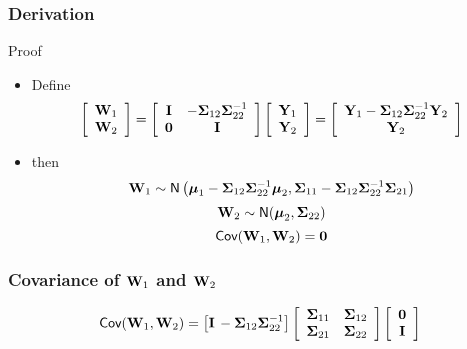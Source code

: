 \documentclass{beamer}
\begin{document}
\begin{frame}
  \frametitle{Derivation}
  \begin{block}{Proof}
    \begin{itemize}
    \item Define
$$  \left[
  \begin{array}{c}
\mathbf{W}_1  \\ \mathbf{W}_2 \end{array} \right] =  \left[ \begin{array}{cc}
\mathbf{I} & -\boldsymbol{\Sigma}_{12} \boldsymbol{\Sigma}_{22}^{-1}  \\ \mathbf{0} & \mathbf{I} \end{array} \right]  \left[
  \begin{array}{c}
\mathbf{Y}_1  \\ \mathbf{Y}_2 \end{array} \right] =  \left[
  \begin{array}{c}
\mathbf{Y}_1 - \boldsymbol{\Sigma}_{12} \boldsymbol{\Sigma}_{22}^{-1} \mathbf{Y}_2  \\ \mathbf{Y}_2 \end{array} \right]
 $$
\pause
\item  then
$$\mathbf{W}_1 \sim \textsf{N}\left( \boldsymbol{\mu}_1 - \boldsymbol{\Sigma}_{12} \boldsymbol{\Sigma}_{22}^{-1} \boldsymbol{\mu}_2,
\boldsymbol{\Sigma}_{11} - \boldsymbol{\Sigma}_{12}\boldsymbol{\Sigma}_{22}^{-1} \boldsymbol{\Sigma}_{21} \right) $$ \pause
$$\mathbf{W}_2 \sim \textsf{N}(\boldsymbol{\mu}_2, \boldsymbol{\Sigma}_{22})$$ \pause
$$\textsf{Cov}(\mathbf{W}_1, \mathbf{W}_2) = \mathbf{0}$$
  \end{itemize}
  \end{block}
\end{frame}
\begin{frame}
  \frametitle{Covariance of $\mathbf{W}_1$ and $\mathbf{W}_2$}
  \begin{block}{}

    $$\textsf{Cov}(\mathbf{W}_1, \mathbf{W}_2) = \left[\mathbf{I} \, -\boldsymbol{\Sigma}_{12}
        \boldsymbol{\Sigma}_{22}^{-1} \right]   \left[ \begin{array}{cc}
\boldsymbol{\Sigma}_{11} &  \boldsymbol{\Sigma}_{12}  \\
\boldsymbol{\Sigma}_{21} & \boldsymbol{\Sigma}_{22} \end{array} \right] \left[
\begin{array}{c} \mathbf{0} \\ \mathbf{I} \end{array}
\right] $$
  \end{block}

  \vspace{3in}
\end{frame}
\end{document}
